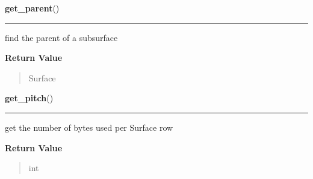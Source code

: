 \hspace{.8\funcindent}\begin{boxedminipage}{\funcwidth}

    \raggedright \textbf{get\_parent}()

    \vspace{-1.5ex}

    \rule{\textwidth}{0.5\fboxrule}
\setlength{\parskip}{2ex}
    find the parent of a subsurface

\setlength{\parskip}{1ex}
      \textbf{Return Value}
    \vspace{-1ex}

      \begin{quote}
      Surface

      \end{quote}

    \end{boxedminipage}

    \label{pygame:Surface:get_pitch}

    \vspace{0.5ex}

\hspace{.8\funcindent}\begin{boxedminipage}{\funcwidth}

    \raggedright \textbf{get\_pitch}()

    \vspace{-1.5ex}

    \rule{\textwidth}{0.5\fboxrule}
\setlength{\parskip}{2ex}
    get the number of bytes used per Surface row

\setlength{\parskip}{1ex}
      \textbf{Return Value}
    \vspace{-1ex}

      \begin{quote}
      int

      \end{quote}

    \end{boxedminipage}

    \label{pygame:Surface:get_rect}

    \vspace{0.5ex}


